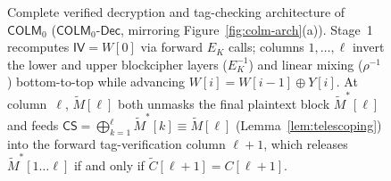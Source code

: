 \documentclass[11pt,a4paper]{article}
\theoremstyle{definition}
\theoremstyle{remark}
\newcommand{\COLMzero}{\mathsf{COLM}_0}
\newcommand{\IV}{\mathsf{IV}}
\newcommand{\CS}{\mathsf{CS}}
\begin{document}
\begin{figure}[t!]
\caption{Complete verified decryption and tag-checking architecture of $\COLMzero$ ($\mathsf{COLM}_0\text{-}\mathsf{Dec}$, mirroring Figure~\ref{fig:colm-arch}(a)). Stage~1 recomputes $\IV = W[0]$ via forward $E_K$ calls; columns $1, \dots, \ell$ invert the lower and upper blockcipher layers ($E_K^{-1}$) and linear mixing ($\rho^{-1}$) bottom-to-top while advancing $W[i] = W[i-1] \oplus Y[i]$. At column~$\ell$, $\tilde{M}[\ell]$ both unmasks the final plaintext block $\tilde{M}^*[\ell]$ and feeds $\CS = \bigoplus_{k=1}^\ell \tilde{M}^*[k] \equiv \tilde{M}[\ell]$ (Lemma~\ref{lem:telescoping}) into the forward tag-verification column $\ell+1$, which releases $\tilde{M}^*[1 \dots \ell]$ if and only if $\tilde{C}[\ell+1] = C[\ell+1]$.}
\label{fig:colm-dec}
\end{figure}
\end{document}
